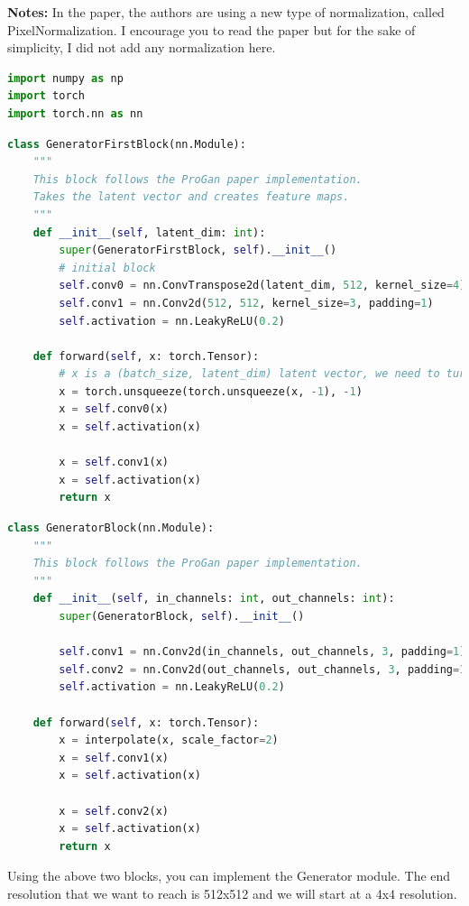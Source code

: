 \textbf{Notes:} In the paper, the authors are using a new type of normalization, called PixelNormalization. I encourage you to read the paper but for the sake of simplicity, I did not add any normalization here.

\begin{lstlisting}[language=Python]
import numpy as np
import torch
import torch.nn as nn
\end{lstlisting}

\begin{lstlisting}[language=Python]
class GeneratorFirstBlock(nn.Module):
    """
    This block follows the ProGan paper implementation.
    Takes the latent vector and creates feature maps.
    """
    def __init__(self, latent_dim: int):
        super(GeneratorFirstBlock, self).__init__()
        # initial block 
        self.conv0 = nn.ConvTranspose2d(latent_dim, 512, kernel_size=4)
        self.conv1 = nn.Conv2d(512, 512, kernel_size=3, padding=1)
        self.activation = nn.LeakyReLU(0.2)

    def forward(self, x: torch.Tensor):
        # x is a (batch_size, latent_dim) latent vector, we need to turn it into a feature map
        x = torch.unsqueeze(torch.unsqueeze(x, -1), -1)
        x = self.conv0(x)
        x = self.activation(x)
        
        x = self.conv1(x)
        x = self.activation(x)
        return x
\end{lstlisting}

\begin{lstlisting}[language=Python]
class GeneratorBlock(nn.Module):
    """
    This block follows the ProGan paper implementation.
    """
    def __init__(self, in_channels: int, out_channels: int):
        super(GeneratorBlock, self).__init__()

        self.conv1 = nn.Conv2d(in_channels, out_channels, 3, padding=1)
        self.conv2 = nn.Conv2d(out_channels, out_channels, 3, padding=1)
        self.activation = nn.LeakyReLU(0.2)

    def forward(self, x: torch.Tensor):
        x = interpolate(x, scale_factor=2)
        x = self.conv1(x)
        x = self.activation(x)

        x = self.conv2(x)
        x = self.activation(x)
        return x
\end{lstlisting}

Using the above two blocks, you can implement the Generator module. The end resolution that we want to reach is 512x512 and we will start at a 4x4 resolution.

